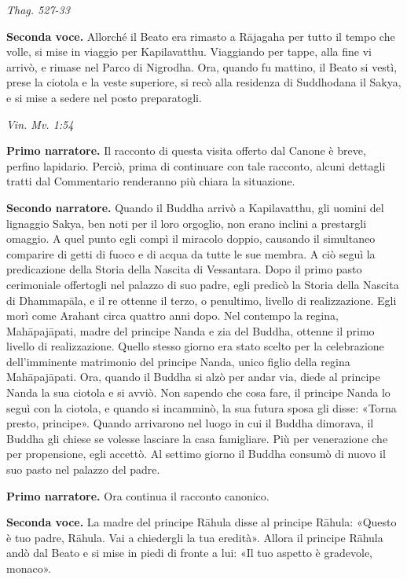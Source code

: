 \emph{Thag. 527-33}


\textbf{Seconda voce.} Allorché il Beato era rimasto a Rājagaha per tutto il
tempo che volle, si mise in viaggio per Kapilavatthu. Viaggiando per
tappe, alla fine vi arrivò, e rimase nel Parco di Nigrodha. Ora, quando
fu mattino, il Beato si vestì, prese la ciotola e la veste superiore, si
recò alla residenza di Suddhodana il Sakya, e si mise a sedere nel posto
preparatogli.


\emph{Vin. Mv. 1:54}


\textbf{Primo narratore.} Il racconto di questa visita offerto dal Canone è
breve, perfino lapidario. Perciò, prima di continuare con tale racconto,
alcuni dettagli tratti dal Commentario renderanno più chiara la
situazione.


\textbf{Secondo narratore.} Quando il Buddha arrivò a Kapilavatthu, gli uomini
del lignaggio Sakya, ben noti per il loro orgoglio, non erano inclini a
prestargli omaggio. A quel punto egli compì il miracolo doppio, causando
il simultaneo comparire di getti di fuoco e di acqua da tutte le sue
membra. A ciò seguì la predicazione della Storia della Nascita di
Vessantara. Dopo il primo pasto cerimoniale offertogli nel palazzo di
suo padre, egli predicò la Storia della Nascita di Dhammapāla, e il re
ottenne il terzo, o penultimo, livello di realizzazione. Egli morì come
Arahant circa quattro anni dopo. Nel contempo la regina, Mahāpajāpati,
madre del principe Nanda e zia del Buddha, ottenne il primo livello di
realizzazione. Quello stesso giorno era stato scelto per la celebrazione
dell’imminente matrimonio del principe Nanda, unico figlio della regina
Mahāpajāpati. Ora, quando il Buddha si alzò per andar via, diede al
principe Nanda la sua ciotola e si avviò. Non sapendo che cosa fare, il
principe Nanda lo seguì con la ciotola, e quando si incamminò, la sua
futura sposa gli disse: «Torna presto, principe». Quando arrivarono nel
luogo in cui il Buddha dimorava, il Buddha gli chiese se volesse
lasciare la casa famigliare. Più per venerazione che per propensione,
egli accettò. Al settimo giorno il Buddha consumò di nuovo il suo pasto
nel palazzo del padre.


\textbf{Primo narratore.} Ora continua il racconto canonico.


\textbf{Seconda voce.} La madre del principe Rāhula disse al principe Rāhula:
«Questo è tuo padre, Rāhula. Vai a chiedergli la tua eredità». Allora il
principe Rāhula andò dal Beato e si mise in piedi di fronte a lui: «Il
tuo aspetto è gradevole, monaco».


